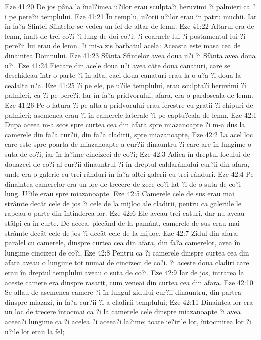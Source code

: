 Eze 41:20  De jos pâna la înal?imea u?ilor erau sculpta?i heruvimi ?i palmieri ca ?i pe pere?ii templului.
Eze 41:21  În templu, u?orii u?ilor erau în patru muchii. Iar în fa?a Sfintei Sfintelor se vedea un fel de altar de lemn.
Eze 41:22  Altarul era de lemn, înalt de trei co?i ?i lung de doi co?i; ?i coarnele lui ?i postamentul lui ?i pere?ii lui erau de lemn. ?i mi-a zis barbatul acela: Aceasta este masa cea de dinaintea Domnului.
Eze 41:23  Sfânta Sfintelor avea doua u?i ?i Sfânta avea doua u?i.
Eze 41:24  Fiecare din acele doua u?i avea câte doua canaturi, care se deschideau într-o parte ?i în alta, caci doua canaturi erau la o u?a ?i doua la cealalta u?a.
Eze 41:25  ?i pe ele, pe u?ile templului, erau sculpta?i heruvimi ?i palmieri, ca ?i pe pere?i. Iar în fa?a pridvorului, afara, era o pardoseala de lemn.
Eze 41:26  Pe o latura ?i pe alta a pridvorului erau ferestre cu gratii ?i chipuri de palmieri; asemenea erau ?i în camerele laterale ?i pe captu?eala de lemn.
Eze 42:1  Dupa aceea m-a scos spre curtea cea din afara spre miazanoapte ?i m-a dus la camerele din fa?a cur?ii, din fa?a cladirii, spre miazanoapte,
Eze 42:2  La acel loc care este spre poarta de miazanoapte a cur?ii dinauntru ?i care are în lungime o suta de co?i, iar în la?ime cincizeci de co?i;
Eze 42:3  Adica în dreptul locului de douazeci de co?i al cur?ii dinauntrul ?i în dreptul caldarâmului cur?ii din afara, unde era o galerie cu trei rânduri în fa?a altei galerii cu trei rânduri.
Eze 42:4  Pe dinaintea camerelor era un loc de trecere de zece co?i lat ?i de o suta de co?i lung. U?ile erau spre miazanoapte.
Eze 42:5  Camerele cele de sus erau mai strâmte decât cele de jos ?i cele de la mijloc ale cladirii, pentru ca galeriile le rapeau o parte din întinderea lor.
Eze 42:6  Ele aveau trei caturi, dar nu aveau stâlpi ca în curte. De aceea, plecând de la pamânt, camerele de sus erau mai strâmte decât cele de jos ?i decât cele de la mijloc.
Eze 42:7  Zidul din afara, paralel cu camerele, dinspre curtea cea din afara, din fa?a camerelor, avea în lungime cincizeci de co?i,
Eze 42:8  Pentru ca ?i camerele dinspre curtea cea din afara aveau o lungime tot numai de cincizeci de co?i. ?i aceste doua cladiri care erau în dreptul templului aveau o suta de co?i.
Eze 42:9  Iar de jos, intrarea la aceste camere era dinspre rasarit, cum veneai din curtea cea din afara.
Eze 42:10  Se aflau de asemenea camere ?i în lungul zidului cur?ii dinauntru, din partea dinspre miazazi, în fa?a cur?ii ?i a cladirii templului;
Eze 42:11  Dinaintea lor era un loc de trecere întocmai ca ?i la camerele cele dinspre miazanoapte ?i avea aceea?i lungime ca ?i acelea ?i aceea?i la?ime; toate ie?irile lor, întocmirea lor ?i u?ile lor erau la fel;
